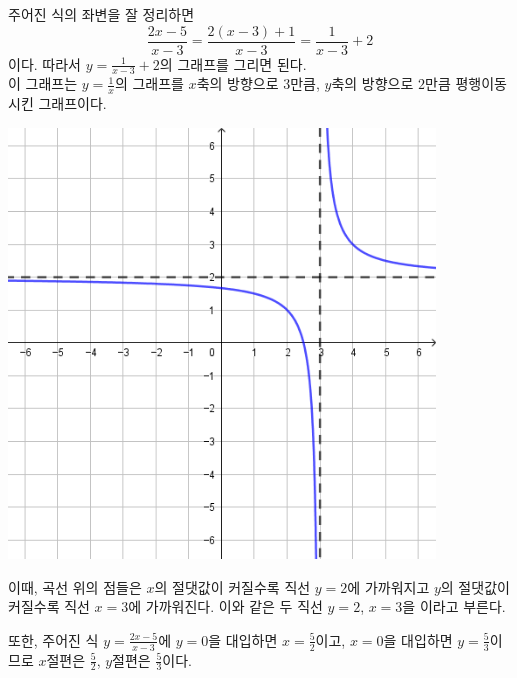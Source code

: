 \documentclass{oblivoir}
\begin{document}
\newpage
%
\begin{mdframed}\label{rational8}
주어진 식의 좌변을 잘 정리하면
\[\frac{2x-5}{x-3}=\frac{2(x-3)+1}{x-3}=\frac1{x-3}+2\]
이다.
따라서 \(y=\frac1{x-3}+2\)의 그래프를 그리면 된다.\\
이 그래프는 \(y=\frac1x\)의 그래프를 \(x\)축의 방향으로 \(3\)만큼, \(y\)축의 방향으로 \(2\)만큼 평행이동시킨 그래프이다.
\begin{center}
\includegraphics[width=0.85\textwidth]{rational_7}
\end{center}
이때, 곡선 위의 점들은 \(x\)의 절댓값이 커질수록 직선 \(y=2\)에 가까워지고 \(y\)의 절댓값이 커질수록 직선 \(x=3\)에 가까워진다.
이와 같은 두 직선 \(y=2\), \(x=3\)을 이라고 부른다.

\bigskip
또한, 주어진 식 \(y=\frac{2x-5}{x-3}\)에 \(y=0\)을 대입하면 \(x=\frac52\)이고, \(x=0\)을 대입하면 \(y=\frac53\)이므로 \(x\)절편은 \(\frac52\), \(y\)절편은 \(\frac53\)이다.
\end{mdframed}
\end{document}
